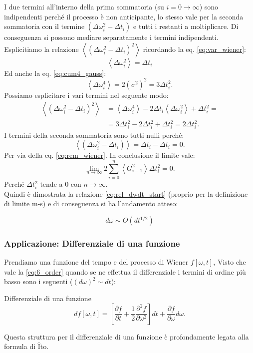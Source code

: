 I due termini all'interno della prima sommatoria (su $i = 0 \to \infty$) sono indipendenti perché il processo è non anticipante, lo stesso vale per la seconda sommatoria con il termine $\left(\Delta\omega^2_i - \Delta t_i\right)$ e tutti i restanti a moltiplicare. Di conseguenza si possono mediare separatamente i termini indipendenti.\\
Esplicitiamo la relazione $\left<\left(\Delta\omega_i^2 - \Delta  t_i\right)^2\right>$ ricordando la eq. \ref{eq:var_wiener}:
\begin{equation}
    \left<\Delta\omega_i^2\right> = \Delta t_i
    \label{eq:rem_wiener}
\end{equation}
Ed anche la eq. \ref{eq:cum4_gauss}:
\[
\left<\Delta\omega^4_i\right> = 2\left(\sigma^2\right)^2 = 3 \Delta t_i^2
.\] 
Possiamo esplicitare i vari termini nel seguente modo:
\[\begin{aligned}
    \left<\left(\Delta\omega_i^2 -\Delta t_i\right)^2\right> &= \left<\Delta\omega_i^4\right> - 2\Delta t_i\left< \Delta\omega_i^2\right> + \Delta t_i^2 = \\
    &=3\Delta t_i^2 - 2\Delta t_i^2 + \Delta t_i^2 = 2 \Delta t^2_i
.\end{aligned}\]
I termini della seconda sommatoria sono tutti nulli perché:
\[
    \left<\left(\Delta\omega_i^2-\Delta t_i\right)\right> = \Delta t_i - \Delta t_i = 0 
.\] 
Per via della eq. \ref{eq:rem_wiener}. In conclusione il limite vale:
\[
    \lim_{n \to \infty} 2\sum_{i = 0}^{n} \left<G_{i-1}^2\right> \Delta t_i^2 = 0
.\] 
Perché $\Delta t_i^2$ tende a $0$ con $n\to\infty$.\\
Quindi è dimostrata la relazione \ref{eq:rel_dwdt_start} (proprio per la definizione di limite m-s) e di conseguenza si ha l'andamento atteso:
\begin{redbox}{}
    \begin{equation}
	d\omega  \sim O(dt^{1 /2}) \label{eq:6_order}
    \end{equation}
\end{redbox}
\noindent
\subsubsection{Applicazione: Differenziale di una funzione}%
\label{subsub:Applicazione: Differenziale di una funzione}
Prendiamo una funzione del tempo e del processo di Wiener $f\left[\omega,t\right]$, Visto che vale la \ref{eq:6_order} quando se ne effettua il differenziale i termini di ordine più basso sono i seguenti ($\left(d\omega\right)^2 \sim dt$):
\begin{bluebox}{Differenziale di una funzione}
    \[
	df\left[\omega,t\right] = \left[\frac{\partial f}{\partial t} + \frac{1}{2}\frac{\partial ^2 f}{\partial \omega^2} \right]dt + \frac{\partial f}{\partial \omega} d\omega
    .\] 
\end{bluebox}
\noindent
Questa struttura per il differenziale di una funzione è profondamente legata alla formula di $\hat{\text{I}}$to.
